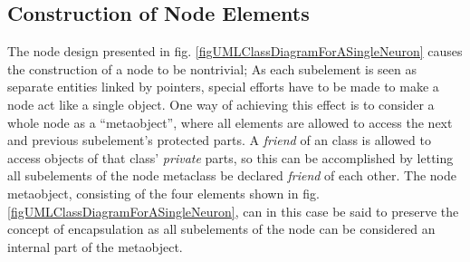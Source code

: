 		\subsection{Construction of Node Elements}
			The node design presented in fig. \ref{figUMLClassDiagramForASingleNeuron} causes the construction of a node to be nontrivial; 
				As each subelement is seen as separate entities linked by pointers, special efforts have to be made to make a node act like a single object.
			One way of achieving this effect is to consider a whole node as a ``metaobject'', where all elements are allowed to access the next and previous subelement's protected parts.
			A \emph{friend} of an class is allowed to access objects of that class' \emph{private} parts\cite{Stroustrup2000KAP11}, so this can be accomplished by letting all subelements of the node metaclass be declared \emph{friend} of each other. %
			The node metaobject, consisting of the four elements shown in fig. \ref{figUMLClassDiagramForASingleNeuron}, can in this case be said to preserve 
				the concept of encapsulation	as all subelements of the node can be considered an internal part of the metaobject. 
			
